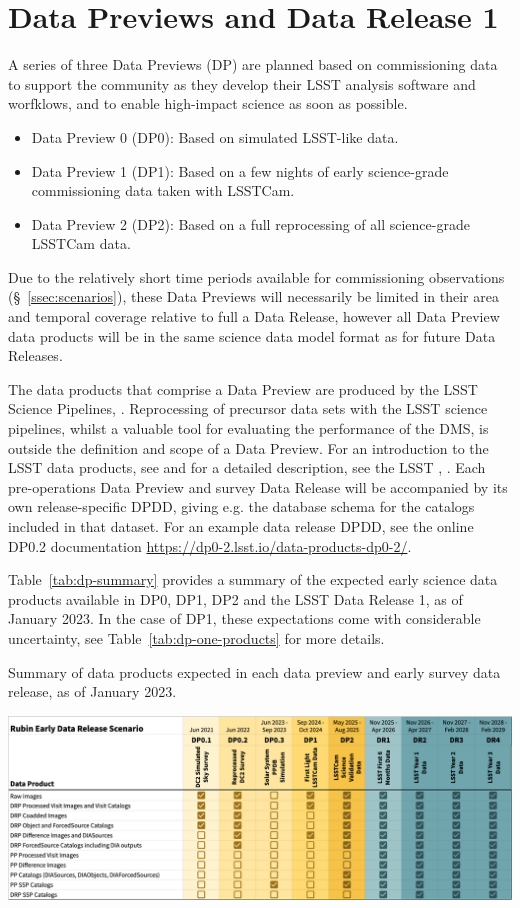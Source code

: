 \section{Data Previews and Data Release 1} 
\label{sec:datapreview}

A series of three Data Previews (DP) are planned  based on commissioning data to support the community as they develop their LSST analysis software and worfklows, and to enable high-impact science as soon as possible.
\begin{itemize}
\item Data Preview 0 (DP0): Based on simulated LSST-like data.
\item Data Preview 1 (DP1): Based on a few nights of early science-grade commissioning data taken with LSSTCam.
\item Data Preview 2 (DP2): Based on a full reprocessing of all science-grade LSSTCam data.
\end{itemize}

Due to the relatively short time periods available for commissioning observations (\S~\ref{ssec:scenarios}), these Data Previews will necessarily be limited in their area and temporal coverage relative to full a Data Release, however all Data Preview data products will be in the same science data model format as for future Data Releases.

The data products that comprise a Data Preview are produced by the LSST Science Pipelines, \cite{2019ASPC..523..521B,2018PASJ...70S...5B}.
Reprocessing of precursor data sets with the LSST science pipelines, whilst a valuable tool for evaluating the performance of the DMS, is outside the definition and scope of a Data Preview.
For an introduction to the LSST data products, see \citet{RubinDataProductsAbridged} and for a detailed description, see the LSST \dpdd{},  .
Each pre-operations Data Preview and survey Data Release will be accompanied by its own release-specific DPDD, giving e.g. the  database schema for the catalogs included in that dataset.
For an example data release DPDD, see the online DP0.2 documentation {\url{https://dp0-2.lsst.io/data-products-dp0-2/}}.

Table~\ref{tab:dp-summary}  provides a summary of the expected early science data products available in DP0, DP1, DP2 and the LSST Data Release 1, as of January 2023.
In the case of DP1, these expectations come with considerable uncertainty, see Table~\ref{tab:dp-one-products} for more details.
\begin{table}[ht]
\centering
\label{tab:dp-summary}
\caption{Summary of data products expected in each data preview and early survey data release, as of January 2023.}
\includegraphics[width=\linewidth]{figures/DPR-summary}
\end{table}

